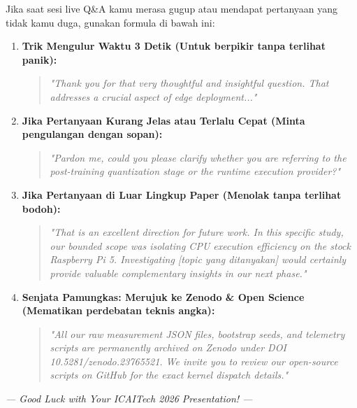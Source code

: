 \documentclass[11pt,a4paper]{article}
\begin{document}
Jika saat sesi live Q\&A kamu merasa gugup atau mendapat pertanyaan yang tidak kamu duga, gunakan formula di bawah ini:

\begin{enumerate}[label=\textbf{\arabic*.}]
  \item \textbf{Trik Mengulur Waktu 3 Detik (Untuk berpikir tanpa terlihat panik):}
  \begin{quote}
  \textit{"Thank you for that very thoughtful and insightful question. That addresses a crucial aspect of edge deployment..."}
  \end{quote}

  \item \textbf{Jika Pertanyaan Kurang Jelas atau Terlalu Cepat (Minta pengulangan dengan sopan):}
  \begin{quote}
  \textit{"Pardon me, could you please clarify whether you are referring to the post-training quantization stage or the runtime execution provider?"}
  \end{quote}

  \item \textbf{Jika Pertanyaan di Luar Lingkup Paper (Menolak tanpa terlihat bodoh):}
  \begin{quote}
  \textit{"That is an excellent direction for future work. In this specific study, our bounded scope was isolating CPU execution efficiency on the stock Raspberry Pi 5. Investigating [topic yang ditanyakan] would certainly provide valuable complementary insights in our next phase."}
  \end{quote}

  \item \textbf{Senjata Pamungkas: Merujuk ke Zenodo \& Open Science (Mematikan perdebatan teknis angka):}
  \begin{quote}
  \textit{"All our raw measurement JSON files, bootstrap seeds, and telemetry scripts are permanently archived on Zenodo under DOI 10.5281/zenodo.23765521. We invite you to review our open-source scripts on GitHub for the exact kernel dispatch details."}
  \end{quote}
\end{enumerate}

\vspace{1.0em}
\begin{center}
  \textit{--- Good Luck with Your ICAITech 2026 Presentation! ---}
\end{center}
\end{document}
